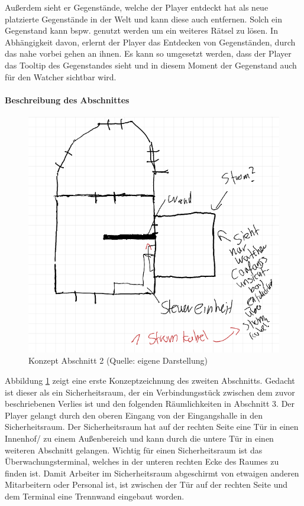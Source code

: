 Außerdem sieht er Gegenstände, welche der Player entdeckt hat als neue platzierte Gegenstände in der Welt und kann diese auch entfernen. Solch ein Gegenstand kann bspw. genutzt werden um ein weiteres Rätsel zu lösen.
In Abhängigkeit davon, erlernt der Player das Entdecken von Gegenständen, durch das nahe vorbei gehen an ihnen. Es kann so umgesetzt werden, dass der Player das Tooltip des Gegenstandes sieht und in diesem Moment der Gegenstand auch für den Watcher sichtbar wird.

\paragraph{Beschreibung des Abschnittes}

\begin{figure}[ht]
\centering
\includegraphics[width=1\linewidth]{content/pictures/Abschnitt_Concept_01.PNG}
\caption{Konzept Abschnitt 2 (Quelle: eigene Darstellung)}
\label{fig:section_01_concept}
\end{figure}

Abbildung \ref{fig:section_01_concept} zeigt eine erste Konzeptzeichnung des zweiten Abschnitts. Gedacht ist dieser als ein Sicherheitsraum, der ein Verbindungsstück zwischen dem zuvor beschriebenen Verlies ist und den folgenden Räumlichkeiten in Abschnitt 3. Der Player gelangt durch den oberen Eingang von der Eingangshalle in den Sicherheitsraum. Der Sicherheitsraum hat auf der rechten Seite eine Tür in einen Innenhof/ zu einem Außenbereich und kann durch die untere Tür in einen weiteren Abschnitt gelangen. Wichtig für einen Sicherheitsraum ist das Überwachungsterminal, welches in der unteren rechten Ecke des Raumes zu finden ist. Damit Arbeiter im Sicherheitsraum abgeschirmt von etwaigen anderen Mitarbeitern oder Personal ist, ist zwischen der Tür auf der rechten Seite und dem Terminal eine Trennwand eingebaut worden.

